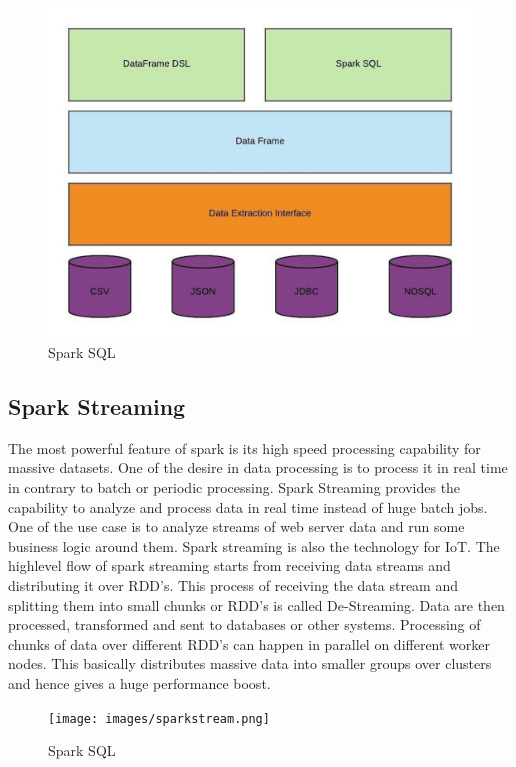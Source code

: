 \begin{figure}[!ht]
  \centering\includegraphics[width=\columnwidth]{images/sparksql.jpeg} \caption{Spark
  SQL}\label{f:fig3}
\end{figure}


\subsection{Spark Streaming}

The most powerful feature of spark is its high speed processing capability for massive datasets. One
of the desire in data processing is to process it in real time in contrary to batch or periodic
processing. Spark Streaming provides the capability to analyze and process data in real time instead
of huge batch jobs. One of the use case is to analyze streams of web server data and run some
business logic around them. Spark streaming is also the technology for IoT. The highlevel flow of
spark streaming starts from receiving data streams and distributing it over RDD's. This process of 
receiving the data stream and splitting them into small chunks or RDD's is called De-Streaming.
Data are then processed, transformed and sent to databases or other systems. Processing of chunks
of data over different RDD's can happen in parallel on different worker nodes. This basically
distributes massive data into smaller groups over clusters and hence gives a huge performance boost.


\begin{figure}[!ht]
  \centering\texttt{[image: images/sparkstream.png]} \caption{Spark
  SQL~\cite{hid-sp18-522-sparkstream-image} }\label{f:fig4}
\end{figure}

